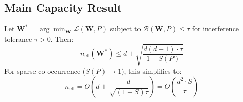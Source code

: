 \subsection{Main Capacity Result}

\begin{theorem}
\label{thm:capacity}
Let $\mathbf{W}^* = \arg\min_{\mathbf{W}} \mathcal{L}(\mathbf{W}, P)$ subject to $\mathcal{B}(\mathbf{W}, P) \leq \tau$ for interference tolerance $\tau > 0$. Then:
\begin{equation}
n_{\text{eff}}(\mathbf{W}^*) \leq d + \sqrt{\frac{d(d-1) \cdot \tau}{1 - S(P)}}
\label{eq:capacity_upper}
\end{equation}
For sparse co-occurrence ($S(P) \to 1$), this simplifies to:
\begin{equation}
n_{\text{eff}} = O\left(d + \frac{d}{\sqrt{(1-S)\tau}}\right) = O\left(\frac{d^2 \cdot S}{\tau}\right)
\end{equation}
\end{theorem}

